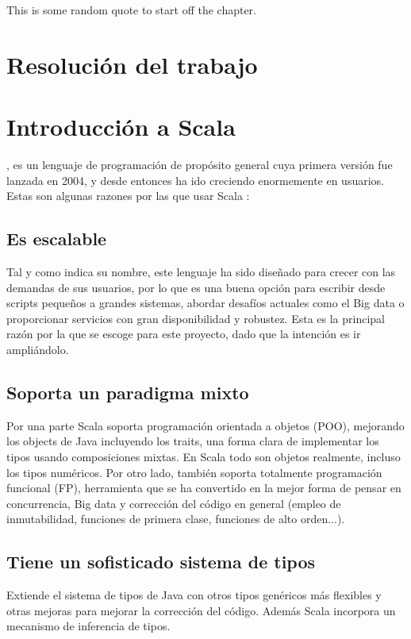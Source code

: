 \begin{savequote}[75mm]
This is some random quote to start off the chapter.
\end{savequote}

\chapter{Resolución del trabajo}
\chapter*{Introducción a Scala}
, es un lenguaje de programación de propósito general cuya primera versión fue lanzada en 2004, y desde entonces ha ido creciendo enormemente en usuarios. Estas son algunas razones por las que usar Scala \citet{9781491949856}:
\section*{Es escalable} Tal y como indica su nombre, este lenguaje ha sido diseñado para crecer con las demandas de sus usuarios, por lo que es una buena opción para escribir desde scripts pequeños a grandes sistemas, abordar desafíos actuales como el Big data o proporcionar servicios con gran disponibilidad y robustez. Esta es la principal razón por la que se escoge para este proyecto, dado que la intención es ir ampliándolo.

\section*{Soporta un paradigma mixto} Por una parte \textsf{Scala} soporta programación orientada a objetos (POO), mejorando los objects de Java incluyendo los \textsf{traits}, una forma clara de implementar los tipos usando composiciones mixtas. En \textsf{Scala} todo son objetos realmente, incluso los tipos numéricos. Por otro lado, también soporta totalmente programación funcional (FP),
herramienta que se ha convertido en la mejor forma de pensar en concurrencia, Big data y corrección del código en general (empleo de inmutabilidad, funciones de primera clase, funciones de alto orden...). 

\section*{Tiene un sofisticado sistema de tipos} Extiende el sistema de tipos de Java con otros tipos genéricos más flexibles y otras mejoras para mejorar la corrección del código. Además \textsf{Scala} incorpora un mecanismo de inferencia de tipos.
